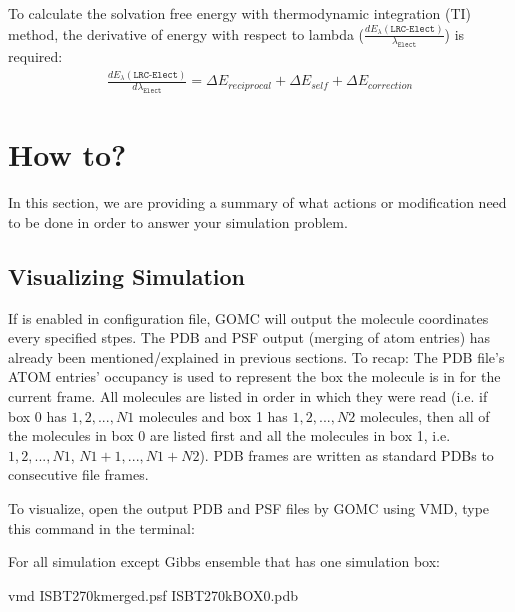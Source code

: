 \documentclass[letterpaper,10pt,english]{sphinxmanual}
\begin{document}
To calculate the solvation free energy with thermodynamic integration (TI) method, the derivative of energy with
respect to lambda (\(\frac{dE_{\lambda}(\texttt{LRC-Elect})}{\lambda_{\texttt{Elect}}}\)) is required:
\begin{equation*}
\begin{split}\frac{dE_{\lambda}(\texttt{LRC-Elect})}{d\lambda_{\texttt{Elect}}} = \Delta E_{reciprocal} + \Delta E_{self} + \Delta E_{correction}\end{split}
\end{equation*}

\chapter{How to?}
\label{\detokenize{howto:how-to}}\label{\detokenize{howto::doc}}
In this section, we are providing a summary of what actions or modification need to be done in order to answer your simulation problem.


\section{Visualizing Simulation}
\label{\detokenize{howto:visualizing-simulation}}
If  is enabled in configuration file, GOMC will output the molecule coordinates every
specified stpes. The PDB and PSF output (merging of atom entries) has already been mentioned/explained in
previous sections. To recap: The PDB file’s ATOM entries’ occupancy is used to represent the box the molecule
is in for the current frame. All molecules are listed in order in which they were read (i.e. if box 0 has
\(1, 2, ..., N1\) molecules and box 1 has \(1, 2, ..., N2\) molecules, then all of the molecules in
box 0 are listed first and all the molecules in box 1, i.e. \(1, 2 ,... ,N1\), \(N1 + 1, ..., N1 + N2\)).
PDB frames are written as standard PDBs to consecutive file frames.

To visualize, open the output PDB and PSF files by GOMC using VMD, type this command in the terminal:

For all simulation except Gibbs ensemble that has one simulation box:

\begin{sphinxVerbatim}[commandchars=\\\{\}]
\PYGZdl{} vmd   ISB\PYGZus{}T\PYGZus{}270\PYGZus{}k\PYGZus{}merged.psf  ISB\PYGZus{}T\PYGZus{}270\PYGZus{}k\PYGZus{}BOX\PYGZus{}0.pdb
\end{sphinxVerbatim}
\end{document}
